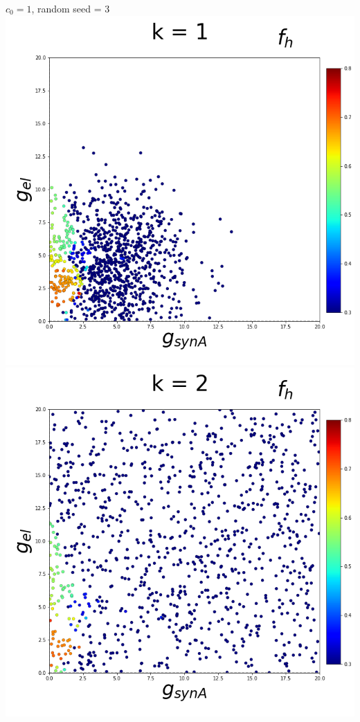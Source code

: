 \documentclass[11pt]{article}
\begin{document}
\begin{center}
{\Large $c_0 = 1$, random seed = 3} \\
\includegraphics[scale=0.125]{DSN_figs/STGCircuit_DSN_c=0_rs=3_k=1.png}
\includegraphics[scale=0.125]{DSN_figs/STGCircuit_DSN_c=0_rs=3_k=2.png}

\end{center}
\end{document}
